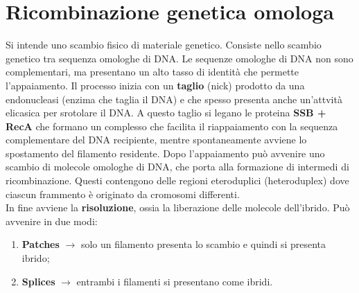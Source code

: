 \section{Ricombinazione genetica omologa}
Si intende uno scambio fisico di materiale genetico. Consiste nello scambio genetico tra sequenza omologhe di DNA. Le sequenze omologhe di DNA non sono complementari, ma presentano un alto tasso di identità che permette l'appaiamento. 
Il processo inizia con un \textbf{taglio} (nick) prodotto da una endonucleasi (enzima che taglia il DNA) e che spesso presenta anche un'attvità elicasica per srotolare il DNA. A questo taglio si legano le proteina \textbf{SSB + RecA} che formano un complesso che facilita il riappaiamento con la sequenza complementare del DNA recipiente, mentre spontaneamente avviene lo spostamento del filamento residente. Dopo l'appaiamento può avvenire uno scambio di molecole omologhe di DNA, che porta alla formazione di intermedi di ricombinazione. Questi contengono delle regioni eteroduplici (heteroduplex) dove ciascun frammento è originato da cromosomi differenti. 
\\In fine avviene la \textbf{risoluzione}, ossia la liberazione delle molecole dell'ibrido. Può avvenire in due modi: 
\begin{enumerate}
    \item \textbf{Patches} $\xrightarrow{}$ solo un filamento presenta lo scambio e quindi si presenta ibrido;
    \item \textbf{Splices} $\xrightarrow{}$ entrambi i filamenti si presentano come ibridi.
\end{enumerate}
